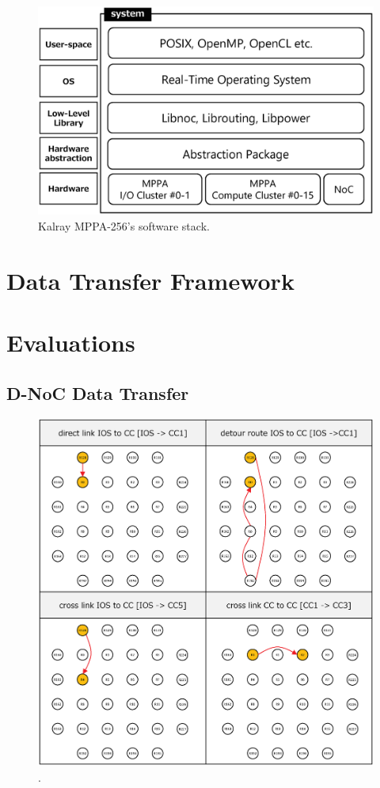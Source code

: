 \documentclass{sig-alternate-05-2015}
\begin{document}
\begin{figure}[t]
  \centering
  \includegraphics[width=1.0\linewidth]{../figure/softwarestack.eps}
  \caption{\label{fig:software_stack}
    Kalray MPPA-256's software stack.}
\end{figure}


\section{Data Transfer Framework}
\label{sec:framework}


\section{Evaluations}
\label{sec:evaluations}

\subsection{D-NoC Data Transfer}
\label{sec:dnoc_ecal}

\begin{figure}[t]
  \centering
  \includegraphics[width=1.0\linewidth]{../figure/noc_routes.eps}
  \caption{\label{fig:noc_routes}
    .}
\end{figure}
\end{document}
